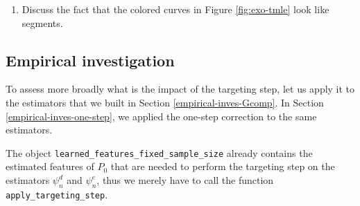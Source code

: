 \documentclass[
  11pt,
  openright,twoside]{book}
\providecommand{\tightlist}{%
  \setlength{\itemsep}{0pt}\setlength{\parskip}{0pt}}
\theoremstyle{definition}
\theoremstyle{definition}
\theoremstyle{definition}
\theoremstyle{definition}
\theoremstyle{remark}
\begin{document}
\begin{enumerate}
\def\labelenumi{\arabic{enumi}.}
\setcounter{enumi}{2}
\tightlist
\item
  Discuss the fact that the colored curves in Figure \ref{fig:exo-tmle}
  look like segments.
\end{enumerate}

\hypertarget{empirical-investigation}{%
\subsection{Empirical investigation}\label{empirical-investigation}}

To assess more broadly what is the impact of the targeting step, let us apply
it to the estimators that we built in Section \ref{empirical-inves-Gcomp}. In
Section \ref{empirical-inves-one-step}, we applied the one-step correction to
the same estimators.

The object \texttt{learned\_features\_fixed\_sample\_size} already contains the estimated
features of \(P_{0}\) that are needed to perform the targeting step on the
estimators \(\psi_{n}^{d}\) and \(\psi_{n}^{e}\), thus we merely have to call the
function \texttt{apply\_targeting\_step}.
\end{document}
